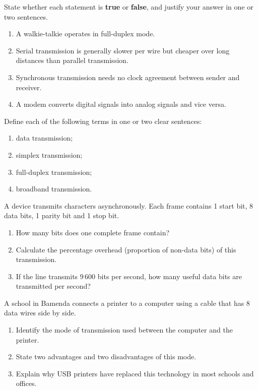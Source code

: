 \documentclass[11pt]{article}
\newcounter{popsec}
\newcounter{popsub}
\newcommand{\courssub}[1]{%
  \stepcounter{popsub}%
  \par\vspace{9pt}\noindent{\popxbold\fontsize{11.5}{13}\selectfont\color{popink}{\color{poporange}\thepopsec.\thepopsub}\hspace{6pt}#1}\par\nopagebreak\vspace{4pt}
}
\begin{document}
\begin{exercice}
State whether each statement is \textbf{true} or \textbf{false}, and justify your answer in one or two sentences.
\begin{enumerate}
\item A walkie-talkie operates in full-duplex mode.
\item Serial transmission is generally slower per wire but cheaper over long distances than parallel transmission.
\item Synchronous transmission needs no clock agreement between sender and receiver.
\item A modem converts digital signals into analog signals and vice versa.
\end{enumerate}
\end{exercice}

\begin{exercice}[Definitions]
Define each of the following terms in one or two clear sentences:
\begin{enumerate}
\item data transmission;
\item simplex transmission;
\item full-duplex transmission;
\item broadband transmission.
\end{enumerate}
\end{exercice}

\begin{exercice}
A device transmits characters asynchronously. Each frame contains 1 start bit, 8 data bits, 1 parity bit and 1 stop bit.
\begin{enumerate}
\item How many bits does one complete frame contain?
\item Calculate the percentage overhead (proportion of non-data bits) of this transmission.
\item If the line transmits $9\,600$ bits per second, how many useful data bits are transmitted per second?
\end{enumerate}
\end{exercice}

\courssub{I practise}

\begin{exercice}
A school in Bamenda connects a printer to a computer using a cable that has 8 data wires side by side.
\begin{enumerate}
\item Identify the mode of transmission used between the computer and the printer.
\item State two advantages and two disadvantages of this mode.
\item Explain why USB printers have replaced this technology in most schools and offices.
\end{enumerate}
\end{exercice}
\end{document}
